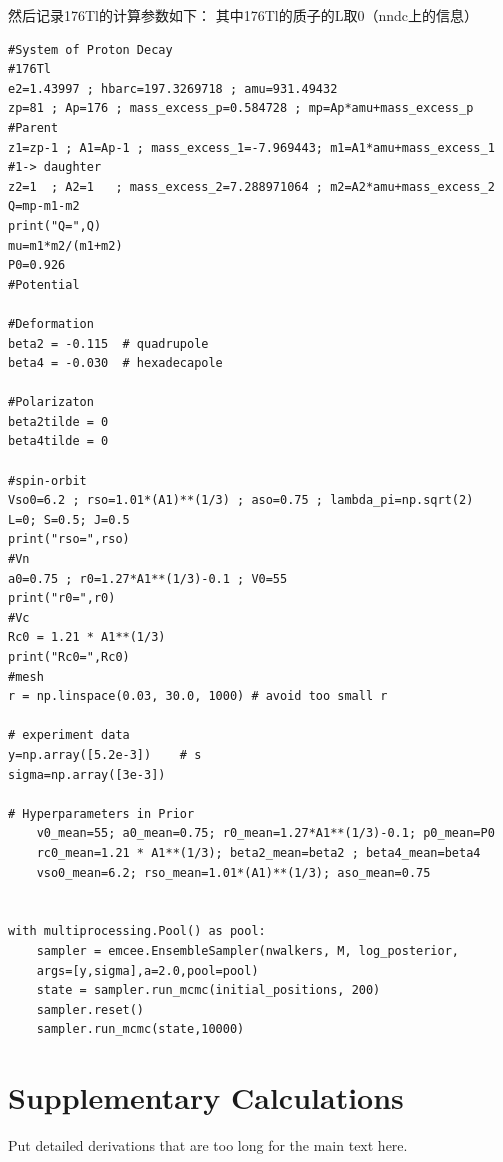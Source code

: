 \documentclass[11pt,a4paper,UTF8,scheme=plain,fontset=fandol]{ctexbook}
\theoremstyle{definition}
\theoremstyle{plain}
\theoremstyle{remark}
\begin{document}
然后记录176Tl的计算参数如下：
其中176Tl的质子的L取0（nndc上的信息）
\begin{verbatim}
#System of Proton Decay
#176Tl
e2=1.43997 ; hbarc=197.3269718 ; amu=931.49432
zp=81 ; Ap=176 ; mass_excess_p=0.584728 ; mp=Ap*amu+mass_excess_p        #Parent
z1=zp-1 ; A1=Ap-1 ; mass_excess_1=-7.969443; m1=A1*amu+mass_excess_1    #1-> daughter
z2=1  ; A2=1   ; mass_excess_2=7.288971064 ; m2=A2*amu+mass_excess_2
Q=mp-m1-m2
print("Q=",Q)
mu=m1*m2/(m1+m2)
P0=0.926
#Potential

#Deformation
beta2 = -0.115  # quadrupole
beta4 = -0.030  # hexadecapole 

#Polarizaton
beta2tilde = 0  
beta4tilde = 0

#spin-orbit
Vso0=6.2 ; rso=1.01*(A1)**(1/3) ; aso=0.75 ; lambda_pi=np.sqrt(2)
L=0; S=0.5; J=0.5
print("rso=",rso)
#Vn
a0=0.75 ; r0=1.27*A1**(1/3)-0.1 ; V0=55
print("r0=",r0)
#Vc
Rc0 = 1.21 * A1**(1/3)          
print("Rc0=",Rc0)
#mesh
r = np.linspace(0.03, 30.0, 1000) # avoid too small r

# experiment data
y=np.array([5.2e-3])    # s
sigma=np.array([3e-3])

# Hyperparameters in Prior
    v0_mean=55; a0_mean=0.75; r0_mean=1.27*A1**(1/3)-0.1; p0_mean=P0
    rc0_mean=1.21 * A1**(1/3); beta2_mean=beta2 ; beta4_mean=beta4
    vso0_mean=6.2; rso_mean=1.01*(A1)**(1/3); aso_mean=0.75

    
with multiprocessing.Pool() as pool:
    sampler = emcee.EnsembleSampler(nwalkers, M, log_posterior, 
    args=[y,sigma],a=2.0,pool=pool)
    state = sampler.run_mcmc(initial_positions, 200)
    sampler.reset()
    sampler.run_mcmc(state,10000)

\end{verbatim}



\appendix
\chapter{Supplementary Calculations}
Put detailed derivations that are too long for the main text here.
\end{document}
